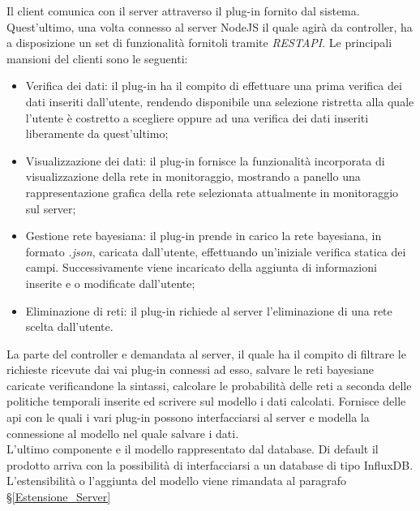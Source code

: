Il client comunica con il server attraverso il plug-in fornito dal sistema. Quest'ultimo, una volta connesso al server NodeJS il quale agirà da controller, ha a disposizione un set di funzionalità fornitoli tramite \textit{REST}\glossario \textit{API}\glossario . Le principali mansioni del clienti sono le seguenti: 
\begin{itemize}
	\item Verifica dei dati: il plug-in  ha il compito di effettuare una prima verifica dei dati inseriti dall'utente, rendendo disponibile una selezione ristretta alla quale l'utente è costretto a scegliere oppure ad una verifica dei dati inseriti liberamente da quest'ultimo;
	\item Visualizzazione dei dati: il plug-in fornisce la funzionalità incorporata di visualizzazione della rete in monitoraggio, mostrando a	panello una rappresentazione grafica della rete selezionata attualmente in monitoraggio sul server;
	\item Gestione rete bayesiana: il plug-in prende in carico la rete bayesiana, in formato \textit{.json}, caricata dall'utente, effettuando un'iniziale verifica statica dei campi. Successivamente viene incaricato della aggiunta di informazioni inserite e o modificate dall'utente; 
	\item Eliminazione di reti: il plug-in richiede al server l'eliminazione di una rete scelta dall'utente. 
\end{itemize}
La parte del controller e demandata al server, il quale ha il compito di filtrare le richieste ricevute dai vai plug-in connessi ad esso, salvare le reti bayesiane caricate verificandone la sintassi, calcolare le probabilità delle reti a seconda delle politiche temporali inserite ed  scrivere sul modello i dati calcolati. 
Fornisce delle api con le quali i vari plug-in possono interfacciarsi al server e modella la connessione al modello nel quale salvare i dati. \\ 
L'ultimo componente e il modello rappresentato dal database. Di default il prodotto arriva con la possibilità di interfacciarsi a un database
di tipo InfluxDB. L'estensibilità o l'aggiunta del modello viene rimandata al paragrafo §\ref{Estensione_Server}


